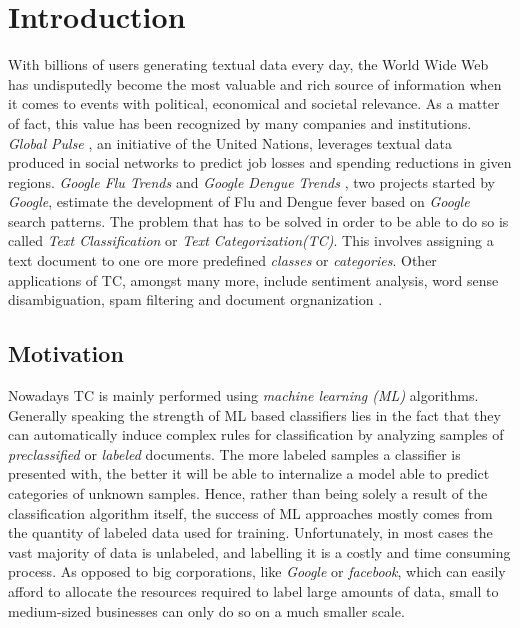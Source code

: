 
\chapter{Introduction}
\label{ch:Introduction}

With billions of users generating textual data every day, the World
Wide Web has undisputedly become the most valuable and rich source
of information when it comes to events with political, economical and
societal relevance. As a matter of fact, this value has been recognized by
many companies and institutions. \emph{Global Pulse} \cite{globalpulse}, an
initiative of the United Nations, leverages textual data produced in social networks to predict job
losses and spending reductions in given regions.
\emph{Google Flu Trends} and \emph{Google Dengue Trends} \cite{googlefludengue},
two projects started by \emph{Google}, estimate the development of Flu and Dengue fever based on \emph{Google} search
patterns. The problem that has to be solved in order to
be able to do so is called \emph{Text Classification} or \emph{Text Categorization(TC)}. This involves
assigning a text document to one ore more predefined \emph{classes} or \emph{categories}. 
Other applications of TC, amongst many more, include sentiment analysis, word
sense disambiguation, spam filtering and document orgnanization \cite{sebastiani2002machine}. 

\section{Motivation}
\label{sec:Motivation}
Nowadays TC is mainly performed using \emph{machine learning (ML)} algorithms.
Generally speaking the strength of ML based classifiers lies in the fact
that they can automatically induce complex rules for classification by
analyzing samples of \textit{preclassified} or \textit{labeled} documents. 
The more labeled samples a classifier is presented with, the better it will be
able to internalize a model able to predict categories of unknown samples. 
Hence, rather than being solely a result of the classification algorithm itself,
the success of ML approaches mostly comes from the quantity of labeled
data used for training. Unfortunately, in most cases the vast majority of
data is unlabeled, and labelling it is a costly and time consuming process. 
As opposed to big corporations, like \emph{Google} or \emph{facebook}, which can
easily afford to allocate the resources required to label large amounts of data, 
small to medium-sized businesses can only do so on a much smaller scale. 


